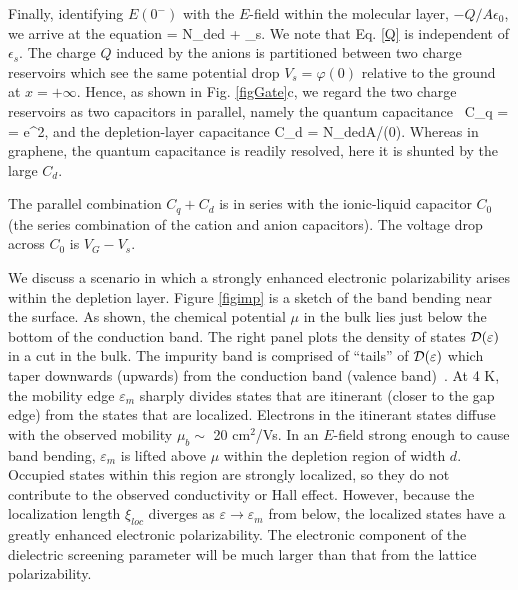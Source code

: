 Finally, identifying $E(0^-)$ with the $E$-field within the molecular layer, $-Q/A\epsilon_0$, we arrive at the equation
\be
{} = N_ded + \sigma_s.
\label{Q}
\ee
We note that Eq. \ref{Q} is independent of $\epsilon_s$.
The charge $Q$ induced by the anions is partitioned between two charge reservoirs which see the same potential drop $V_s = \varphi(0)$ relative to the 
ground at $x=+\infty$. Hence, as shown in Fig. \ref{figGate}c, we regard the two charge reservoirs 
as two capacitors in parallel, namely the 
quantum capacitance~\cite{Luryi}
\be
C_q =  = e^2,
\label{Cq}
\ee 
and the depletion-layer capacitance 
\be
C_d = N_dedA/\varphi(0).
\label{Cd}
\ee
Whereas in graphene, the quantum capacitance is readily resolved,
here it is shunted by the large $C_d$.

The parallel combination $C_q+C_d$ is in series with the ionic-liquid capacitor $C_0$ (the series combination of the cation and anion capacitors). The
voltage drop across $C_0$ is $V_G-V_s$.


\vspace{3mm}

We discuss a scenario in which a strongly enhanced electronic polarizability arises 
within the depletion layer. Figure \ref{figimp} is a sketch of the band bending near the surface. 
As shown, the chemical potential $\mu$ in the bulk lies just below the bottom of the conduction band.
The right panel plots the density of states ${\cal D}(\varepsilon)$ in a cut in the bulk.
The impurity band is comprised of ``tails'' of ${\cal D}(\varepsilon)$ which taper downwards (upwards) from the
conduction band (valence band)~\cite{Beidenkopf2011}. At 4 K, the mobility edge
$\varepsilon_m$ sharply divides states that are itinerant (closer to the gap edge) from 
the states that are localized. Electrons in the itinerant states diffuse with the observed mobility $\mu_b\sim$ 20 cm$^2$/Vs. 
In an $E$-field strong enough to cause band bending, 
$\varepsilon_m$ is lifted above $\mu$ within the depletion region of width $d$. Occupied states within this 
region are strongly localized, so they do not contribute to the observed conductivity or Hall effect. 
However, because the localization length $\xi_{loc}$ diverges as $\varepsilon\to \varepsilon_m$ from below, 
the localized states have a greatly enhanced electronic polarizability. 
The electronic component of the dielectric screening parameter will be much
larger than that from the lattice polarizability.
